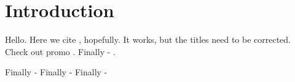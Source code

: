 \chapter*{Introduction}


Hello. Here we cite \citep*{CharlesJ.Geyer}, hopefully. It works, but the titles need to be corrected. Check out promo \citep*{BłażejMiasojedow}. Finally - \citep*{MaximeCrochmore}.

Finally - \citep*{MaximeCrochmore}
Finally - \citep*{MaximeCrochmore}
Finally - \citep*{MaximeCrochmore}